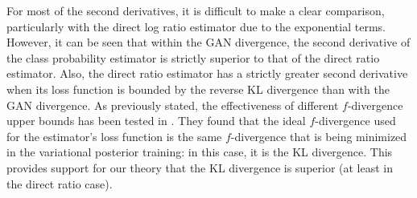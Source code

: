 \documentclass[honours,12pt]{unswthesis}
\numberwithin{equation}{section}
\theoremstyle{definition}
\begin{document}
For most of the second derivatives, it is difficult to make a clear comparison, particularly with the direct log ratio estimator due to the exponential terms. However, it can be seen that within the GAN divergence, the second derivative of the class probability estimator is strictly superior to that of the direct ratio estimator. Also, the direct ratio estimator has a strictly greater second derivative when its loss function is bounded by the reverse KL divergence than with the GAN divergence.
As previously stated, the effectiveness of different $f$-divergence upper bounds has been tested in \citet{nowozin}. They found that the ideal $f$-divergence used for the estimator's loss function is the same $f$-divergence that is being minimized in the variational posterior training: in this case, it is the KL divergence. This provides support for our theory that the KL divergence is superior (at least in the direct ratio case).
\end{document}
